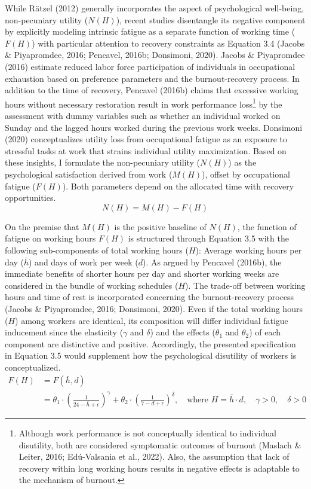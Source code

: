 \documentclass[
  12pt,
]{article}
\begin{document}
While Rätzel (2012) generally incorporates the aspect of psychological
well-being, non-pecuniary utility (\(N(H)\)), recent studies disentangle
its negative component by explicitly modeling intrinsic fatigue as a
separate function of working time (\(F(H)\)) with particular attention
to recovery constraints as Equation 3.4 (Jacobs \& Piyapromdee, 2016;
Pencavel, 2016b; Donsimoni, 2020). Jacobs \& Piyapromdee (2016) estimate
reduced labor force participation of individuals in occupational
exhaustion based on preference parameters and the burnout-recovery
process. In addition to the time of recovery, Pencavel (2016b) claims
that excessive working hours without necessary restoration result in
work performance loss\footnote{Although work performance is not
  conceptually identical to individual disutility, both are considered
  symptomatic outcomes of burnout (Maslach \& Leiter, 2016; Edú-Valsania
  et al., 2022). Also, the assumption that lack of recovery within long
  working hours results in negative effects is adaptable to the
  mechanism of burnout.} by the assessment with dummy variables such as
whether an individual worked on Sunday and the lagged hours worked
during the previous work weeks. Donsimoni (2020) conceptualizes utility
loss from occupational fatigue as an exposure to stressful tasks at work
that strains individual utility maximization. Based on these insights, I
formulate the non-pecuniary utility (\(N(H)\)) as the psychological
satisfaction derived from work (\(M(H)\)), offset by occupational
fatigue (\(F(H)\)). Both parameters depend on the allocated time with
recovery opportunities. \[
N(H) = M(H) - F(H)
\tag{3.4}
\]

On the premise that \(M(H)\) is the positive baseline of \(N(H)\), the
function of fatigue on working hours \(F(H)\) is structured through
Equation 3.5 with the following sub-components of total working hours
(\(H\)): Average working hours per day (\(\bar{h}\)) and days of work
per week (\(d\)). As argued by Pencavel (2016b), the immediate benefits
of shorter hours per day and shorter working weeks are considered in the
bundle of working schedules (\(H\)). The trade-off between working hours
and time of rest is incorporated concerning the burnout-recovery process
(Jacobs \& Piyapromdee, 2016; Donsimoni, 2020). Even if the total
working hours (\(H\)) among workers are identical, its composition will
differ individual fatigue inducement since the elasticity (\(\gamma\)
and \(\delta\)) and the effects (\(\theta_1\) and \(\theta_2\)) of each
component are distinctive and positive. Accordingly, the presented
specification in Equation 3.5 would supplement how the psychological
disutility of workers is conceptualized. \[
\begin{aligned}
F(H)
&=F(\bar{h}, d) \\
&= \theta_1 \cdot \left( \frac{1}{24-\bar{h}+\epsilon} \right)^\gamma + \theta_2 \cdot \left(\frac{1}{7-d+\epsilon}\right)^\delta
, \quad \text{where } H = \bar{h} \cdot d, \quad \gamma>0, \quad \delta>0
\end{aligned}
\tag{3.5}
\]
\end{document}
